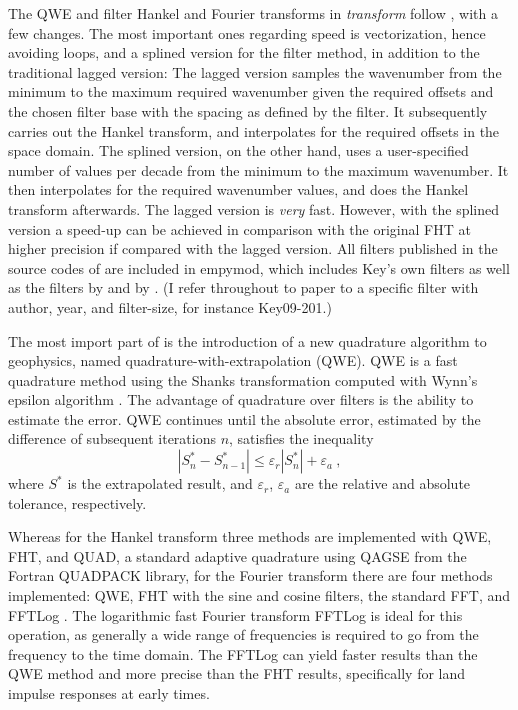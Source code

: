\documentclass[manuscript,revised]{geophysics}
\begin{document}
The QWE and filter Hankel and Fourier transforms in \emph{transform} follow
\cite{GEO.12.Key}, with a few changes. The most important ones regarding speed
is vectorization, hence avoiding loops, and a splined version for the filter
method, in addition to the traditional lagged version: The lagged version
samples the wavenumber from the minimum to the maximum required wavenumber
given the required offsets and the chosen filter base with the spacing as
defined by the filter. It subsequently carries out the Hankel transform, and
interpolates for the required offsets in the space domain. The splined version,
on the other hand, uses a user-specified number of values per decade from the
minimum to the maximum wavenumber. It then interpolates for the required
wavenumber values, and does the Hankel transform afterwards. The lagged version
is \emph{very} fast. However, with the splined version a speed-up can be
achieved in comparison with the original FHT at higher precision if compared
with the lagged version. All filters published in the source codes of
\cite{GEO.09.Key, GEO.12.Key} are included in empymod, which includes Key's own
filters as well as the filters by \cite{TMS.82.Anderson} and by
\cite{GP.07.Kong}. (I refer throughout to paper to a specific filter with
author, year, and filter-size, for instance Key09-201.)

The most import part of \cite{GEO.12.Key} is the introduction of a new
quadrature algorithm to geophysics, named
qua\-dra\-ture-with-ex\-tra\-po\-la\-tion (QWE). QWE is a fast quadrature
method using the Shanks transformation \citep{JMP.55.Shanks} computed with
Wynn's epsilon algorithm \citep{MC.56.Wynn}. The advantage of quadrature over
filters is the ability to estimate the error. QWE continues until the absolute
error, estimated by the difference of subsequent iterations $n$, satisfies the
inequality
%
\begin{equation}
  |S^*_n-S^*_{n-1}| \le \varepsilon_r|S^*_n| + \varepsilon_a\ ,
  \label{eq:err}
\end{equation}
%
where $S^*$ is the extrapolated result, and $\varepsilon_r$, $\varepsilon_a$
are the relative and absolute tolerance, respectively.

Whereas for the Hankel transform three methods are implemented with QWE, FHT,
and QUAD, a standard adaptive quadrature using QAGSE from the Fortran QUADPACK
library, for the Fourier transform there are four methods implemented: QWE, FHT
with the sine and cosine filters, the standard FFT, and FFTLog
\citep{RAS.00.Hamilton}. The logarithmic fast Fourier transform FFTLog is ideal
for this operation, as generally a wide range of frequencies is required to go
from the frequency to the time domain. The FFTLog can yield faster results than
the QWE method and more precise than the FHT results, specifically for land
impulse responses at early times.
\end{document}
